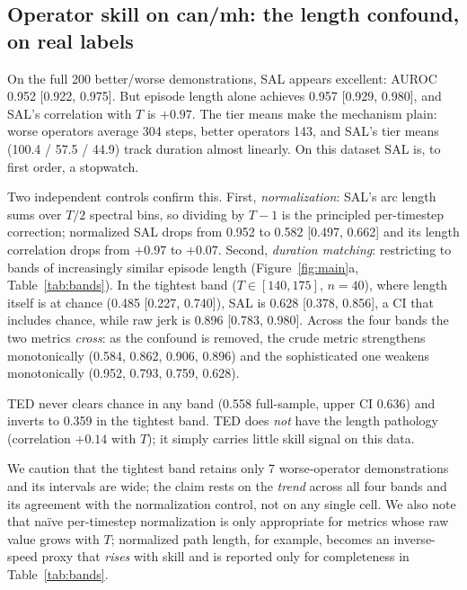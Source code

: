 \documentclass{article}
\begin{document}
\subsection{Operator skill on can/mh: the length confound, on real labels}

On the full 200 better/worse demonstrations, SAL appears excellent: AUROC
0.952 [0.922, 0.975]. But episode length alone achieves 0.957 [0.929,
0.980], and SAL's correlation with $T$ is $+0.97$. The tier means make the
mechanism plain: worse operators average 304 steps, better operators 143,
and SAL's tier means (100.4 / 57.5 / 44.9) track duration almost linearly.
On this dataset SAL is, to first order, a stopwatch.

Two independent controls confirm this. First, \emph{normalization}: SAL's
arc length sums over $T/2$ spectral bins, so dividing by $T{-}1$ is the
principled per-timestep correction; normalized SAL drops from 0.952 to 0.582
[0.497, 0.662] and its length correlation drops from $+0.97$ to $+0.07$.
Second, \emph{duration matching}: restricting to bands of increasingly
similar episode length (Figure~\ref{fig:main}a, Table~\ref{tab:bands}). In
the tightest band ($T \in [140,175]$, $n{=}40$), where length itself is at
chance (0.485 [0.227, 0.740]), SAL is 0.628 [0.378, 0.856], a CI that
includes chance, while raw jerk is 0.896 [0.783, 0.980]. Across the four
bands the two metrics \emph{cross}: as the confound is removed, the crude
metric strengthens monotonically (0.584, 0.862, 0.906, 0.896) and the
sophisticated one weakens monotonically (0.952, 0.793, 0.759, 0.628).

TED never clears chance in any band (0.558 full-sample, upper CI 0.636)
and inverts to 0.359 in the tightest band. TED does \emph{not}
have the length pathology (correlation $+0.14$ with $T$); it simply carries
little skill signal on this data.

We caution that the tightest band retains only 7 worse-operator
demonstrations and its intervals are wide; the claim rests on the
\emph{trend} across all four bands and its agreement with the normalization
control, not on any single cell. We also note that na\"ive per-timestep
normalization is only appropriate for metrics whose raw value grows with
$T$; normalized path length, for example, becomes an inverse-speed proxy
that \emph{rises} with skill and is reported only for completeness in
Table~\ref{tab:bands}.
\end{document}
